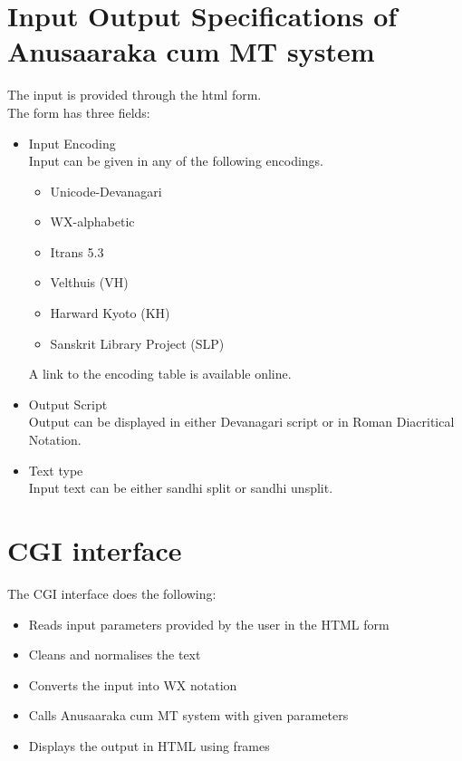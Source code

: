 \documentclass{llncs}
\begin{document}
\section{Input Output Specifications of Anusaaraka cum MT system}
The input is provided through the html form.\\
The form has three fields:\\
\begin{itemize}
\item Input Encoding \\
Input can be given in any of the following encodings.
\begin{itemize}
\item Unicode-Devanagari
\item WX-alphabetic
\item Itrans 5.3
\item Velthuis (VH)
\item Harward Kyoto (KH)
\item Sanskrit Library Project (SLP)
\end{itemize}
A link to the encoding table is available online.
\item Output Script \\
Output can be displayed in either Devanagari script or in Roman Diacritical Notation.
\item Text type \\
Input text can be either sandhi split or sandhi unsplit.
\end{itemize}

\section{CGI interface}
The CGI interface does the following:
\begin{itemize}
\item Reads input parameters provided by the user in the HTML form
\item Cleans and normalises the text
\item Converts the input into WX notation 
\item Calls Anusaaraka cum MT system with given parameters
\item Displays the output in HTML using frames
\end{itemize}
\end{document}
